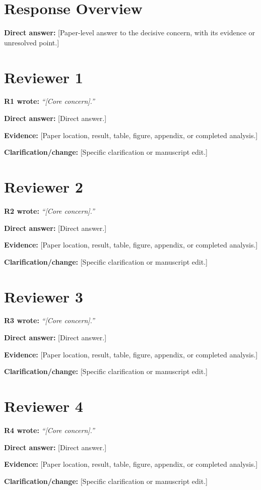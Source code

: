 \documentclass[10pt]{article}
\newcommand{\rlabel}[2]{\textbf{\textcolor{#1}{#2}}}
\newcommand{\quotedconcern}[3]{\par\noindent\textcolor{#1}{\textbf{#2 wrote:}} \emph{``#3''}\par}
\newcommand{\directanswer}[1]{\par\noindent\textbf{Direct answer:} #1\par}
\newcommand{\evidence}[1]{\par\noindent\textbf{Evidence:} #1\par}
\newcommand{\change}[1]{\par\noindent\textbf{Clarification/change:} #1\par}
\begin{document}
\section*{Response Overview}

\directanswer{[Paper-level answer to the decisive concern, with its evidence or unresolved point.]}

\section*{\rlabel{revone}{Reviewer 1}}

\quotedconcern{revone}{R1}{[Core concern].}
\directanswer{[Direct answer.]}
\evidence{[Paper location, result, table, figure, appendix, or completed analysis.]}
\change{[Specific clarification or manuscript edit.]}

\section*{\rlabel{revtwo}{Reviewer 2}}

\quotedconcern{revtwo}{R2}{[Core concern].}
\directanswer{[Direct answer.]}
\evidence{[Paper location, result, table, figure, appendix, or completed analysis.]}
\change{[Specific clarification or manuscript edit.]}

\section*{\rlabel{revthree}{Reviewer 3}}

\quotedconcern{revthree}{R3}{[Core concern].}
\directanswer{[Direct answer.]}
\evidence{[Paper location, result, table, figure, appendix, or completed analysis.]}
\change{[Specific clarification or manuscript edit.]}

\section*{\rlabel{revfour}{Reviewer 4}}

\quotedconcern{revfour}{R4}{[Core concern].}
\directanswer{[Direct answer.]}
\evidence{[Paper location, result, table, figure, appendix, or completed analysis.]}
\change{[Specific clarification or manuscript edit.]}
\end{document}
